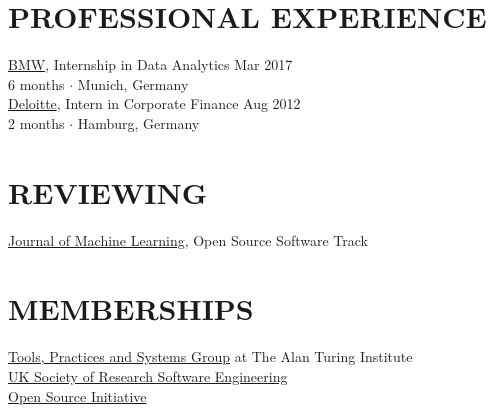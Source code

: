 \documentclass{cv}
\begin{document}
\section{PROFESSIONAL EXPERIENCE}

\href{https://www.bmw.com/en/index.html}{BMW}, Internship in Data Analytics  \hfill Mar 2017 \\
{\color{lightgray} 6 months $\cdot$ Munich, Germany} \\

\href{https://www2.deloitte.com/}{Deloitte}, Intern in Corporate Finance  \hfill Aug 2012 \\
{\color{lightgray} 2 months $\cdot$ Hamburg, Germany} \\

\section{REVIEWING}

\href{https://www.jmlr.org}{Journal of Machine Learning}, Open Source Software Track \\

\section{MEMBERSHIPS}

\href{https://www.turing.ac.uk/research/research-programmes/tools-practices-and-systems}{Tools, Practices and Systems Group} at The Alan Turing Institute \\

\href{https://society-rse.org/}{UK Society of Research Software Engineering} \\

\href{http://opensource.org}{Open Source Initiative}

\end{document}
